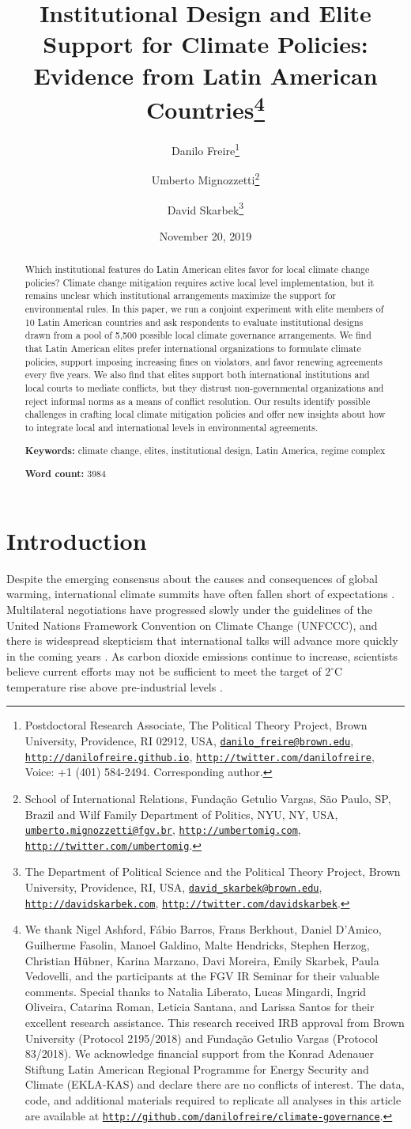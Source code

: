 \documentclass[a4paper,12pt]{article}
\title{Institutional Design and Elite Support for Climate Policies: Evidence from Latin American Countries\thanks{We thank Nigel Ashford, F\'{a}bio Barros, Frans Berkhout, Daniel D'Amico, Guilherme Fasolin, Manoel Galdino, Malte Hendricks, Stephen Herzog, Christian H\"{u}bner, Karina Marzano, Davi Moreira, Emily Skarbek, Paula Vedovelli, and the participants at the FGV IR Seminar for their valuable comments. Special thanks to Natalia Liberato, Lucas Mingardi, Ingrid Oliveira, Catarina Roman, Leticia Santana, and Larissa Santos for their excellent research assistance. This research received IRB approval from Brown University (Protocol 2195/2018) and Funda\c{c}\~{a}o Getulio Vargas (Protocol 83/2018). We acknowledge financial support from the Konrad Adenauer Stiftung Latin American Regional Programme for Energy Security and Climate (EKLA-KAS) and declare there are no conflicts of interest. The data, code, and additional materials required to replicate all analyses in this article are available at \href{http://github.com/danilofreire/climate-governance}{\texttt{http://github.com/danilofreire/climate-governance}}.}}
\author{Danilo Freire\thanks{Postdoctoral Research Associate, The Political Theory Project, Brown University, Providence, RI 02912, USA, \href{mailto:danilo_freire@brown.edu}{\texttt{danilo\_freire@brown.edu}}, \href{http://danilofreire.github.io}{\texttt{http://danilofreire.github.io}}, \href{http://twitter.com/danilofreire}{\texttt{http://twitter.com/danilofreire}}, Voice: +1 (401) 584-2494. Corresponding author.}
\and Umberto Mignozzetti\thanks{School of International Relations, Funda\c{c}\~{a}o Getulio Vargas, S\~{a}o Paulo, SP, Brazil and Wilf Family Department of Politics, NYU, NY, USA, \href{mailto:umberto.mignozzetti@fgv.br}{\texttt{umberto.mignozzetti@fgv.br}}, \href{http://umbertomig.com}{\texttt{http://umbertomig.com}}, \href{http://twitter.com/umbertomig}{\texttt{http://twitter.com/umbertomig}}.}
\and David Skarbek\thanks{The Department of Political Science and the Political Theory Project, Brown University, Providence, RI, USA, \href{mailto:david_skarbek@brown.edu}{\texttt{david\_skarbek@brown.edu}}, \href{http://davidskarbek.com}{\texttt{http://davidskarbek.com}}, \href{http://twitter.com/davidskarbek}{\texttt{http://twitter.com/davidskarbek}}.}}
\date{November 20, 2019}
\begin{document}
\maketitle

\begin{abstract}
\onehalfspacing
\noindent 
Which institutional features do Latin American elites favor for local climate change policies? Climate change mitigation requires active local level implementation, but it remains unclear which institutional arrangements maximize the support for environmental rules. In this paper, we run a conjoint experiment with elite members of 10 Latin American countries and ask respondents to evaluate institutional designs drawn from a pool of 5,500 possible local climate governance arrangements. We find that Latin American elites prefer international organizations to formulate climate policies, support imposing increasing fines on violators, and favor renewing agreements every five years. We also find that elites support both international institutions and local courts to mediate conflicts, but they distrust non-governmental organizations and reject informal norms as a means of conflict resolution. Our results identify possible challenges in crafting local climate mitigation policies and offer new insights about how to integrate local and international levels in environmental agreements.

\vspace{.5cm}

\noindent 
\textbf{Keywords:} climate change, elites, institutional design, Latin America, regime complex

\vspace{.5cm}

\noindent 
\textbf{Word count:} 3984
\end{abstract}

\newpage

\doublespacing

\section{Introduction}%
\label{sec:introduction}

Despite the emerging consensus about the causes and consequences of global warming, international climate summits have often fallen short of expectations \citep{rogelj2010copenhagen, rosen2015wrong, victor2017prove}. Multilateral negotiations have progressed slowly under the guidelines of the United Nations Framework Convention on Climate Change (UNFCCC), and there is widespread skepticism that international talks will advance more quickly in the coming years \citep{cole2015advantages, hjerpe2015views}. As carbon dioxide emissions continue to increase, scientists believe current efforts may not be sufficient to meet the target of $2^{\circ}$C temperature rise above pre-industrial levels \citep{jordan2015emergence}.
\end{document}
